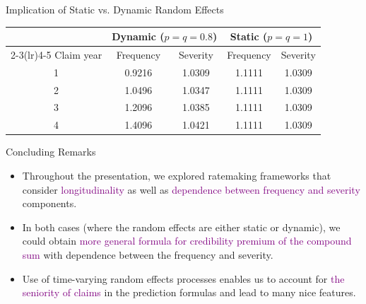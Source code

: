 \documentclass[ignorenonframetext,]{beamer}
\begin{document}
\begin{frame}{Implication of Static vs. Dynamic Random Effects}
\centering
\small
\begin{tabular}{ccccc}
\toprule
 & \multicolumn{2}{c}{Dynamic ($p=q=0.8$)} & \multicolumn{2}{c}{Static ($p=q=1$)} \\
\cmidrule(lr){2-3}\cmidrule(lr){4-5}
Claim year & Frequency & Severity & Frequency & Severity \\
\midrule
1 & 0.9216 & 1.0309 & 1.1111 & 1.0309 \\
2 & 1.0496 & 1.0347 & 1.1111 & 1.0309 \\
3 & 1.2096 & 1.0385 & 1.1111 & 1.0309 \\
4 & 1.4096 & 1.0421 & 1.1111 & 1.0309 \\
\hline\hline
\end{tabular}
\end{frame}

\begin{frame}{Concluding Remarks}
\begin{itemize}
\item Throughout the presentation, we explored ratemaking frameworks that consider \textcolor{purple}{longitudinality} as well as
\textcolor{purple}{dependence between frequency and severity} components.
\item In both cases (where the random effects are either static or dynamic), we could obtain
\textcolor{purple}{more general formula for credibility premium of the compound sum} with dependence between the frequency and severity.
\item Use of time-varying random effects processes enables us to account for \textcolor{purple}{the seniority of claims}
in the prediction formulas and lead to many nice features.
\end{itemize}
\end{frame}
\end{document}
